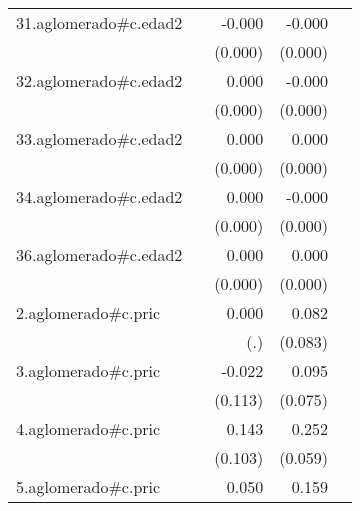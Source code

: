 {\begin{longtable}{l*{4}{D{.}{.}{-1}}}
\addlinespace
31.aglomerado#c.edad2&                     &      -0.000         &      -0.000\sym{***}&                     \\
            &                     &     (0.000)         &     (0.000)         &                     \\
\addlinespace
32.aglomerado#c.edad2&                     &       0.000         &      -0.000         &                     \\
            &                     &     (0.000)         &     (0.000)         &                     \\
\addlinespace
33.aglomerado#c.edad2&                     &       0.000\sym{***}&       0.000         &                     \\
            &                     &     (0.000)         &     (0.000)         &                     \\
\addlinespace
34.aglomerado#c.edad2&                     &       0.000         &      -0.000         &                     \\
            &                     &     (0.000)         &     (0.000)         &                     \\
\addlinespace
36.aglomerado#c.edad2&                     &       0.000\sym{***}&       0.000         &                     \\
            &                     &     (0.000)         &     (0.000)         &                     \\
\addlinespace
2.aglomerado#c.pric&                     &       0.000         &       0.082         &                     \\
            &                     &         (.)         &     (0.083)         &                     \\
\addlinespace
3.aglomerado#c.pric&                     &      -0.022         &       0.095         &                     \\
            &                     &     (0.113)         &     (0.075)         &                     \\
\addlinespace
4.aglomerado#c.pric&                     &       0.143         &       0.252\sym{***}&                     \\
            &                     &     (0.103)         &     (0.059)         &                     \\
\addlinespace
5.aglomerado#c.pric&                     &       0.050         &       0.159\sym{*}  &                     \\

\end{longtable}}

